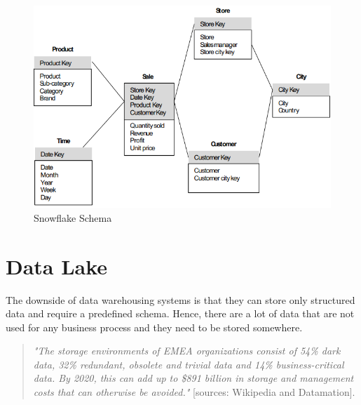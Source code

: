 \begin{figure}[ht!]
    \centering
    \includegraphics[scale=0.7]{images/DFM_snowflake_schema_2.png}
    \caption{Snowflake Schema}
    \label{figSnowflakeSchema}
\end{figure}

\section{Data Lake}

The downside of data warehousing systems is that they can store only structured data and require a predefined schema. Hence, there are a lot of data that are not used for any business process and they need to be stored somewhere.
\begin{quote}
    \textit{"The storage environments of EMEA organizations consist of 54\% dark data, 32\% redundant, obsolete and trivial data and 14\% business-critical data. By 2020, this can add up to \$891 billion in storage and management costs that can otherwise be avoided."} [sources: Wikipedia and Datamation].
\end{quote}


